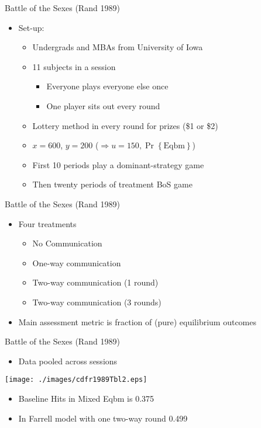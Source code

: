 \documentclass{beamer}
\begin{document}
\begin{frame}{Battle of the Sexes (Rand 1989)}
	\begin{itemize}
		\item Set-up:
		\begin{itemize}
			\item Undergrads and MBAs from University of Iowa
			\item 11 subjects in a session
			\begin{itemize}
				\item Everyone plays everyone else once
				\item One player sits out every round
			\end{itemize}
			\item Lottery method in every round for prizes (\$1 or \$2)
			\item $x=600$, $y=200$ ($\Longrightarrow u=150, \Pr\left\{\text{Eqbm}\right\}$)
			\item First 10 periods play a dominant-strategy game
			\item Then twenty periods of treatment BoS game
		\end{itemize}
	\end{itemize}
\end{frame}

\begin{frame}{Battle of the Sexes (Rand 1989)}
	\begin{itemize}
		\item Four treatments
		\begin{itemize}
			\item No Communication
			\item One-way communication
			\item Two-way communication (1 round)
			\item Two-way communication (3 rounds)
		\end{itemize}
		\item Main assessment metric is fraction of (pure) equilibrium outcomes
	\end{itemize}
\end{frame}

\begin{frame}{Battle of the Sexes (Rand 1989)}
	\begin{itemize}
		\item Data pooled across sessions
	\end{itemize}
	\begin{center}
		\texttt{[image: ./images/cdfr1989Tbl2.eps]}
	\end{center}
		\begin{itemize}
			\item Baseline Hits in Mixed Eqbm is 0.375
			\item In Farrell model with one two-way round 0.499
		\end{itemize}
\end{frame}
\end{document}
